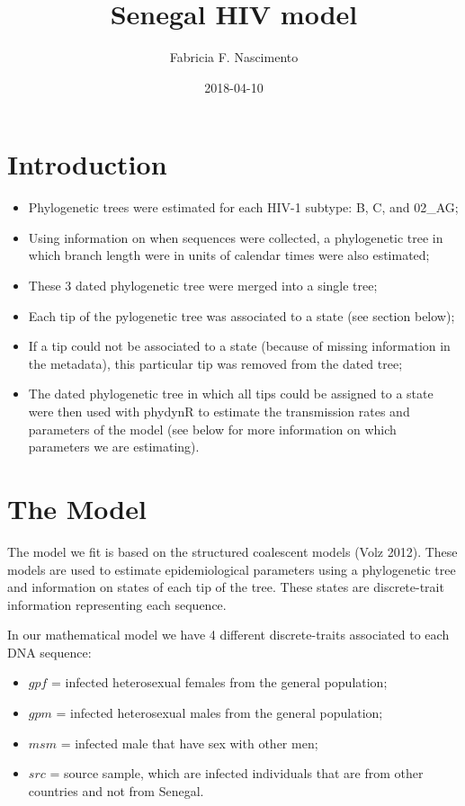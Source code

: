 \documentclass[12pt,]{article}
\title{Senegal HIV model}
\author{Fabricia F. Nascimento}
\date{2018-04-10}
\providecommand{\tightlist}{%
  \setlength{\itemsep}{0pt}\setlength{\parskip}{0pt}}
\begin{document}
\maketitle

\hypertarget{introduction}{%
\section{Introduction}\label{introduction}}

\begin{itemize}
\tightlist
\item
  Phylogenetic trees were estimated for each HIV-1 subtype: B, C, and
  02\_AG;
\item
  Using information on when sequences were collected, a phylogenetic
  tree in which branch length were in units of calendar times were also
  estimated;
\item
  These 3 dated phylogenetic tree were merged into a single tree;
\item
  Each tip of the pylogenetic tree was associated to a state (see
  section below);
\item
  If a tip could not be associated to a state (because of missing
  information in the metadata), this particular tip was removed from the
  dated tree;
\item
  The dated phylogenetic tree in which all tips could be assigned to a
  state were then used with phydynR to estimate the transmission rates
  and parameters of the model (see below for more information on which
  parameters we are estimating).
\end{itemize}

\hypertarget{the-model}{%
\section{The Model}\label{the-model}}

The model we fit is based on the structured coalescent models (Volz
2012). These models are used to estimate epidemiological parameters
using a phylogenetic tree and information on states of each tip of the
tree. These states are discrete-trait information representing each
sequence.

In our mathematical model we have 4 different discrete-traits associated
to each DNA sequence:

\begin{itemize}
\tightlist
\item
  \(gpf\) = infected heterosexual females from the general population;
\item
  \(gpm\) = infected heterosexual males from the general population;
\item
  \(msm\) = infected male that have sex with other men;
\item
  \(src\) = source sample, which are infected individuals that are from
  other countries and not from Senegal.
\end{itemize}
\end{document}
